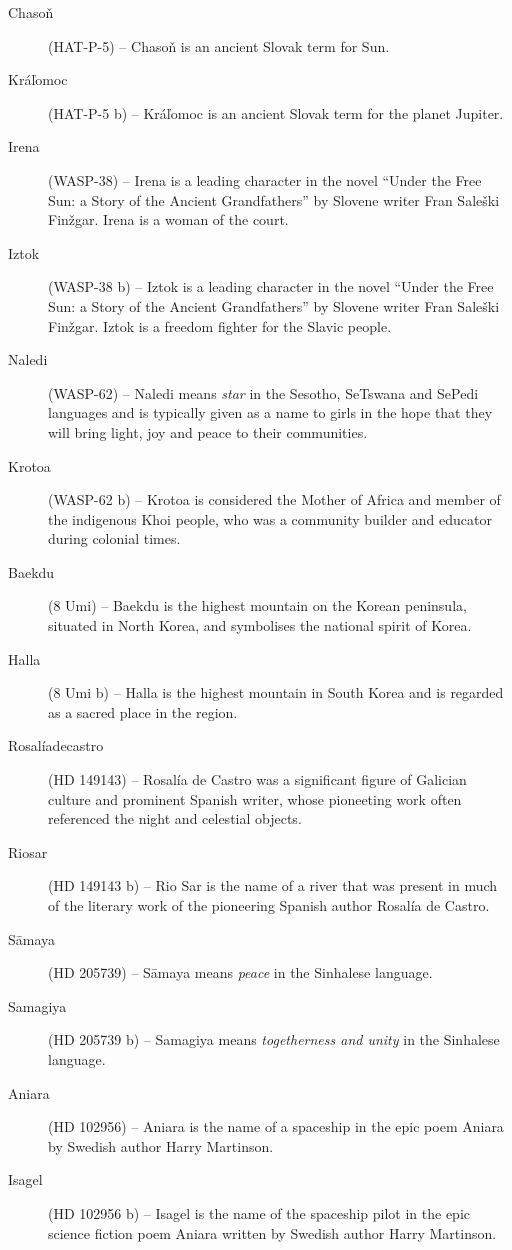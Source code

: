 \begin{description}
\item[Chasoň] (HAT-P-5) -- Chasoň is an ancient Slovak term for Sun.
\item[Kráľomoc] (HAT-P-5 b) -- Kráľomoc is an ancient Slovak term for the planet Jupiter.
\item[Irena] (WASP-38) -- Irena is a leading character in the novel ``Under the Free Sun: a Story of the Ancient Grandfathers'' by Slovene writer Fran Saleški Finžgar. Irena is a woman of the court.
\item[Iztok] (WASP-38 b) -- Iztok is a leading character in the novel ``Under the Free Sun: a Story of the Ancient Grandfathers'' by Slovene writer Fran Saleški Finžgar. Iztok is a freedom fighter for the Slavic people.
\item[Naledi] (WASP-62) -- Naledi means \textit{star} in the Sesotho, SeTswana and SePedi languages and is typically given as a name to girls in the hope that they will bring light, joy and peace to their communities.
\item[Krotoa] (WASP-62 b) -- Krotoa is considered the Mother of Africa and member of the indigenous Khoi people, who was a community builder and educator during colonial times.
\item[Baekdu] (8 Umi) -- Baekdu is the highest mountain on the Korean peninsula, situated in North Korea, and symbolises the national spirit of Korea.
\item[Halla] (8 Umi b) -- Halla is the highest mountain in South Korea and is regarded as a sacred place in the region.
\item[Rosalíadecastro] (HD 149143) -- Rosalía de Castro was a significant figure of Galician culture and prominent Spanish writer, whose pioneeting work often referenced the night and celestial objects.
\item[Riosar] (HD 149143 b) -- Rio Sar is the name of a river that was present in much of the literary work of the pioneering Spanish author Rosalía de Castro.
\item[Sāmaya] (HD 205739) -- Sāmaya means \textit{peace} in the Sinhalese language.
\item[Samagiya] (HD 205739 b) -- Samagiya means \textit{togetherness and unity} in the Sinhalese language.
\item[Aniara] (HD 102956) -- Aniara is the name of a spaceship in the epic poem Aniara by Swedish author Harry Martinson.
\item[Isagel] (HD 102956 b) -- Isagel is the name of the spaceship pilot in the epic science fiction poem Aniara written by Swedish author Harry Martinson.

\end{description}
